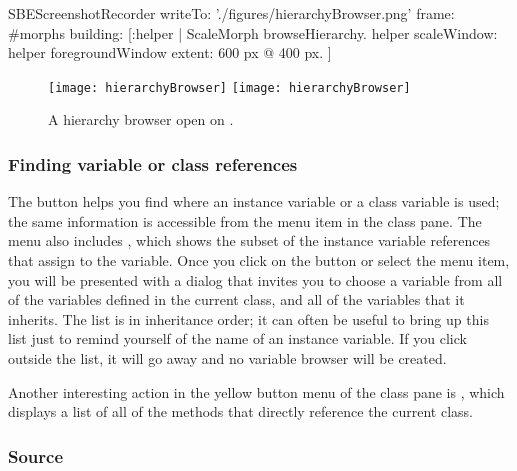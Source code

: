 \documentclass[a4paper,10pt,twoside]{book}
\begin{document}

\begin{ExecuteSmalltalkScript}
SBEScreenshotRecorder writeTo: './figures/hierarchyBrowser.png' frame: #morphs building: [:helper |
	ScaleMorph browseHierarchy.
	helper scaleWindow: helper foregroundWindow extent: 600 px @ 400 px.
]
\end{ExecuteSmalltalkScript}
\begin{figure}[btp]
	\begin{center}
	\ifluluelse
		{\texttt{[image: hierarchyBrowser]}}
		{\texttt{[image: hierarchyBrowser]}}
	\end{center}
	\caption{A hierarchy browser open on .}
	\label{fig:hierarchyBrowser}
\end{figure}

\subsubsection{Finding variable or class references}
\label{sec:variables}

The  button helps you find where an instance variable or a class variable is used; the same information is accessible from the  menu item  in the class pane.
The menu also includes , which shows the subset of the instance variable references that assign to the variable.
Once you click on the button or select the menu item, you will be presented with a dialog that invites you to choose a variable from all of the variables defined in the current class, and all of the variables that it inherits.
The list is in inheritance order; it can often be useful to bring up this list just to remind yourself of the name of an instance variable.
If you click outside the list, it will go away and no variable browser will be created.

Another interesting action in the yellow button menu of the class pane is , which displays a list of all of the methods that directly reference the current class.

\subsubsection{Source}
\label{sec:sources}
\end{document}
